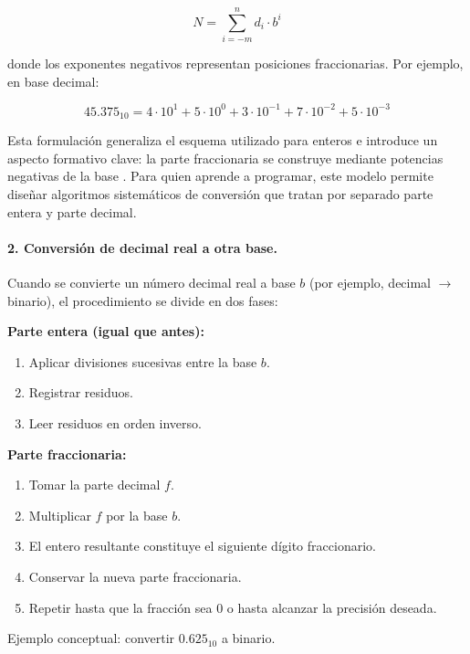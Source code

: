 \documentclass[12pt,twoside]{book}
\begin{document}
						\[
						N = \sum_{i=-m}^{n} d_i \cdot b^i
						\]
						
						\noindent
						donde los exponentes negativos representan posiciones fraccionarias. Por ejemplo, en base decimal:
						
						\[
						45.375_{10} = 4\cdot10^1 + 5\cdot10^0 + 3\cdot10^{-1} + 7\cdot10^{-2} + 5\cdot10^{-3}
						\]
						
						\noindent
						Esta formulación generaliza el esquema utilizado para enteros e introduce un aspecto formativo clave: la parte fraccionaria se construye mediante potencias negativas de la base \cite{Wirth1976Algorithms,Hanly2015Problem,Manzano2017Programacion}. Para quien aprende a programar, este modelo permite diseñar algoritmos sistemáticos de conversión que tratan por separado parte entera y parte decimal.
						
						\paragraph{2. Conversión de decimal real a otra base.} Cuando se convierte un número decimal real a base $b$ (por ejemplo, decimal $\rightarrow$ binario), el procedimiento se divide en dos fases:
						
						\noindent
						\textbf{Parte entera (igual que antes):}
						\begin{enumerate}
							\item Aplicar divisiones sucesivas entre la base $b$.
							\item Registrar residuos.
							\item Leer residuos en orden inverso.
						\end{enumerate}
						
						\noindent
						\textbf{Parte fraccionaria:}
						\begin{enumerate}
							\item Tomar la parte decimal $f$.
							\item Multiplicar $f$ por la base $b$.
							\item El entero resultante constituye el siguiente dígito fraccionario.
							\item Conservar la nueva parte fraccionaria.
							\item Repetir hasta que la fracción sea 0 o hasta alcanzar la precisión deseada.
						\end{enumerate}
						
						\noindent
						Ejemplo conceptual: convertir $0.625_{10}$ a binario.
						
\end{document}

